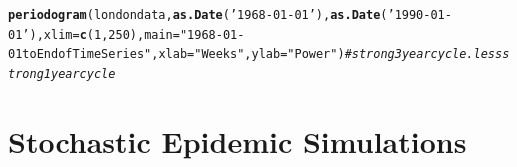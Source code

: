 \documentclass[12pt]{article}\usepackage[]{graphicx}\usepackage[]{color}
\makeatletter
\newcommand{\hlnum}[1]{\textcolor[rgb]{0.686,0.059,0.569}{#1}}%
\newcommand{\hlstr}[1]{\textcolor[rgb]{0.192,0.494,0.8}{#1}}%
\newcommand{\hlcom}[1]{\textcolor[rgb]{0.678,0.584,0.686}{\textit{#1}}}%
\newcommand{\hlstd}[1]{\textcolor[rgb]{0.345,0.345,0.345}{#1}}%
\newcommand{\hlkwc}[1]{\textcolor[rgb]{0.333,0.667,0.333}{#1}}%
\newcommand{\hlkwd}[1]{\textcolor[rgb]{0.737,0.353,0.396}{\textbf{#1}}}%
\newenvironment{kframe}{%
 \def\at@end@of@kframe{}%
 \ifinner\ifhmode%
  \def\at@end@of@kframe{\end{minipage}}%
  \begin{minipage}{\columnwidth}%
 \fi\fi%
 \def\FrameCommand##1{\hskip\@totalleftmargin \hskip-\fboxsep
 \colorbox{shadecolor}{##1}\hskip-\fboxsep
     \hskip-\linewidth \hskip-\@totalleftmargin \hskip\columnwidth}%
 \MakeFramed {\advance\hsize-\width
   \@totalleftmargin\z@ \linewidth\hsize
   \@setminipage}}%
 {\par\unskip\endMakeFramed%
 \at@end@of@kframe}
\newenvironment{knitrout}{}{} %
\makeatother
\begin{document}
\begin{enumerate}[(a)]
\begin{knitrout}
\begin{kframe}
{\ttfamily\noindent\bfseries\color{errorcolor}{\#\# Error in eval(expr, envir, enclos): object 'londondata' not found}}\begin{alltt}
\hlkwd{periodogram}\hlstd{(londondata,}\hlkwd{as.Date}\hlstd{(}\hlstr{'1968-01-01'}\hlstd{),}\hlkwd{as.Date}\hlstd{(}\hlstr{'1990-01-01'}\hlstd{),}\hlkwc{xlim}\hlstd{=}\hlkwd{c}\hlstd{(}\hlnum{1}\hlstd{,}\hlnum{250}\hlstd{),} \hlkwc{main}\hlstd{=}\hlstr{"1968-01-01 to End of Time Series"}\hlstd{,}\hlkwc{xlab}\hlstd{=}\hlstr{"Weeks"}\hlstd{,} \hlkwc{ylab}\hlstd{=}\hlstr{"Power"}\hlstd{)}  \hlcom{#strong 3 year cycle. less strong 1 year cycle}
\end{alltt}


{\ttfamily\noindent\bfseries\color{errorcolor}{\#\# Error in eval(expr, envir, enclos): object 'londondata' not found}}\end{kframe}
\end{knitrout}

\end{enumerate}

\section{Stochastic Epidemic Simulations}

\SEintro
\end{document}
